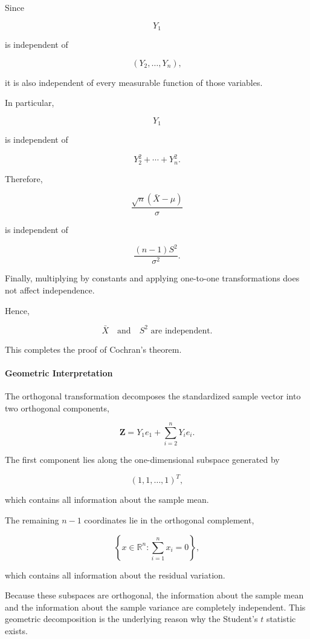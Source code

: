 \documentclass[11pt]{article}
\begin{document}
\begin{mdframed}[
		linewidth=0.8pt,
		roundcorner=6pt,
		backgroundcolor=gray!5,
		linecolor=gray!60,
		innertopmargin=10pt,
		innerbottommargin=10pt,
		innerleftmargin=10pt,
		innerrightmargin=10pt
		]
		Since
		
		\[
		Y_1
		\]
		
		is independent of
		
		\[
		(Y_2,\ldots,Y_n),
		\]
		
		it is also independent of every measurable function of those variables.
		
		In particular,
		
		\[
		Y_1
		\]
		
		is independent of
		
		\[
		Y_2^2+\cdots+Y_n^2.
		\]
		
		Therefore,
		
		\[
		\frac{\sqrt n(\bar X-\mu)}{\sigma}
		\]
		
		is independent of
		
		\[
		\frac{(n-1)S^2}{\sigma^2}.
		\]
		
		Finally, multiplying by constants and applying one-to-one transformations
		does not affect independence.
		
		Hence,
		
		\[
		\boxed{
			\bar X
			\quad\text{and}\quad
			S^2
			\text{ are independent.}
		}
		\]
		
		This completes the proof of Cochran's theorem.
		
		\vspace{0.3cm}
		
		\paragraph{Geometric Interpretation}
		
		The orthogonal transformation decomposes the standardized sample vector
		into two orthogonal components,
		
		\[
		\mathbf Z
		=
		Y_1e_1
		+
		\sum_{i=2}^{n}Y_ie_i.
		\]
		
		The first component lies along the one-dimensional subspace generated by
		
		\[
		(1,1,\ldots,1)^T,
		\]
		
		which contains all information about the sample mean.
		
		The remaining $n-1$ coordinates lie in the orthogonal complement,
		
		\[
		\left\{
		x\in\mathbb R^n:
		\sum_{i=1}^{n}x_i=0
		\right\},
		\]
		
		which contains all information about the residual variation.
		
		Because these subspaces are orthogonal, the information about the sample
		mean and the information about the sample variance are completely
		independent. This geometric decomposition is the underlying reason why the
		Student's $t$ statistic exists.
		
	\end{mdframed}
	
\end{document}
